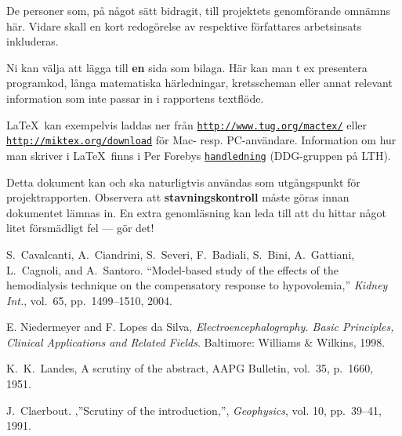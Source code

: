 \documentclass[twoside,twocolumn,9pt,a4paper]{IEEEtran}
\begin{document}
De personer som, på något sätt bidragit, till projektets genomförande omnämns här. Vidare skall en kort redogörelse av respektive författares arbetsinsats inkluderas. 
 

\appendix 
Ni kan välja att lägga till \textbf{en} sida som bilaga. Här kan man t ex presentera programkod, långa matematiska härledningar, kretsscheman eller annat relevant information som inte passar in i rapportens textflöde.

\LaTeX \ kan exempelvis laddas ner från \texttt{\url{http://www.tug.org/mactex/}}  eller \texttt{\url{http://miktex.org/download}} för Mac- resp. PC-användare. Information om hur man skriver i \LaTeX \ finns i Per Forebys \href{http://www.ddg.lth.se/perf/handledning/handledning.pdf}{\texttt{handledning}}  (DDG-gruppen på LTH).

Detta dokument kan och ska naturligtvis användas som utgångspunkt för projektrapporten. Observera att \textbf{stavningskontroll} måste göras innan dokumentet lämnas in. En extra genomläsning kan leda till att du hittar något litet försmädligt fel --- gör det!





\begin{thebibliography}{99} %

 S.~Cavalcanti, A.~Ciandrini, S.~Severi, F.~Badiali, S.~Bini, A.~Gattiani, L.~Cagnoli, and A.~Santoro. ``Model-based study of the effects of the hemodialysis technique on the compensatory response to hypovolemia,'' \textit{Kidney Int.}, vol.~65, pp.~1499--1510, 2004.

 E. Niedermeyer and F. {Lopes da Silva}, \textit{Electroencephalography. Basic Principles, Clinical Applications and Related Fields}. Baltimore: Williams \& Wilkins, 1998.

 K.~K.~Landes, A scrutiny of the abstract, AAPG Bulletin, vol.~35, p.~1660, 1951.

 J.~Claerbout. ‚''Scrutiny of the introduction‚'', \textit{Geophysics}, vol. 10, pp.~39--41, 1991.

\end{thebibliography}
\end{document}
